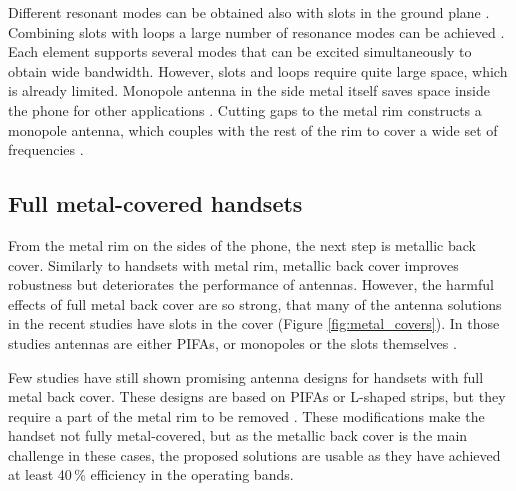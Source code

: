 Different resonant modes can be obtained also with slots in the ground plane \cite{yuan_slot}. Combining slots with loops a large number of resonance modes can be achieved \cite{hsu_compact}. Each element supports several modes that can be excited simultaneously to obtain wide bandwidth. However, slots and loops require quite large space, which is already limited. Monopole antenna in the side metal itself saves space inside the phone for other applications \cite{lee_monopole}. Cutting gaps to the metal rim constructs a monopole antenna, which couples with the rest of the rim to cover a wide set of frequencies \cite{chen_metal_frame}. %

\subsection{Full metal-covered handsets}
\label{sec:full_cover}
From the metal rim on the sides of the phone, the next step is metallic back cover. Similarly to handsets with metal rim, metallic back cover improves robustness but deteriorates the performance of antennas. However, the harmful effects of full metal back cover are so strong, that many of the antenna solutions in the recent studies have slots in the cover (Figure \ref{fig:metal_covers}). In those studies antennas are either PIFAs, or monopoles or the slots themselves \cite{wu_pier, son_wideband_mimo, wu_tunable, zhong_pier}. 

Few studies have still shown promising antenna designs for handsets with full metal back cover. These designs are based on PIFAs or L-shaped strips, but they require a part of the metal rim to be removed \cite{chen_compact_lte, wu_pier}. These modifications make the handset not fully metal-covered, but as the metallic back cover is the main challenge in these cases, the proposed solutions are usable as they have achieved at least 40\,\% efficiency in the operating bands. %

